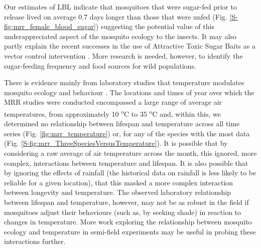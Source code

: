 \documentclass[]{article}
\begin{document}
Our estimates of LBL indicate that mosquitoes that were sugar-fed prior
to release lived on average 0.7 days longer than those that were unfed (Fig. \ref{S-fig:mrr_female_blood_sugar})
suggesting the potential value of this underappreciated aspect of the
mosquito ecology to the insects. It may also partly explain the recent
successes in the use of Attractive Toxic Sugar Baits as a vector
control intervention \citep{muller2008decline,muller2010effective,muller2010field,muller2010successful,beier2012attractive}. More research is
needed, however, to identify the sugar-feeding frequency and food
sources for wild populations.

There is evidence mainly from laboratory studies that temperature
modulates mosquito ecology and behaviour \citep{yang2009assessing,brady2013modelling,murdock2012complex,beck2013effect}. The
locations and times of year over which the MRR studies were conducted
encompassed a large range of average air temperatures, from
approximately 10 \textsuperscript{o}C to 35 \textsuperscript{o}C and,
within this, we determined no relationship between lifespan and
temperature across all time series (Fig. \ref{fig:mrr_temperature}) or, for any of the species
with the most data (Fig. \ref{S-fig:mrr_ThreeSpeciesVersusTemperature}). It is possible that by considering a raw
average of air temperature across the month, this ignored, more complex, interactions between temperature and lifespan. It is also possible that by ignoring the effects of
rainfall (the historical data on rainfall is less likely to be reliable
for a given location), that this masked a more complex interaction
between longevity and temperature. The observed laboratory relationship
between lifespan and temperature, however, may not be as robust in the
field if mosquitoes adjust their behaviours (such as, by seeking shade)
in reaction to changes in temperature. More work exploring the
relationship between mosquito ecology and temperature in semi-field
experiments may be useful in probing these interactions further.
\end{document}
